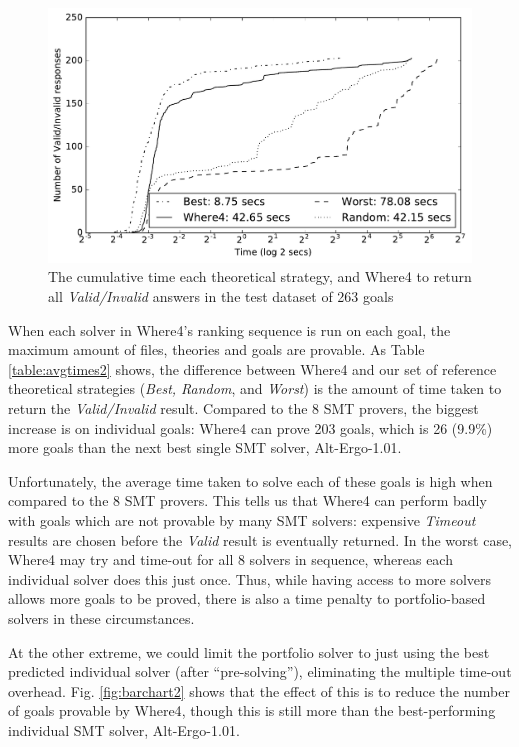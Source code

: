 \documentclass[submission,copyright,creativecommons]{eptcs}
\begin{document}
\begin{figure}
	\centering
	\includegraphics[width=0.8\linewidth]{line-graph-eval-provers}
	\caption{The cumulative time each theoretical strategy, and \textsf{Where4} to return all \textit{Valid/Invalid} answers in the test dataset of 263 goals}
	\label{fig:line-graph-eval-provers}
\end{figure}

When each solver in \textsf{Where4}'s ranking sequence is run on each goal, the maximum amount of files, theories and goals are provable. As Table \ref{table:avgtimes2} shows, the difference between \textsf{Where4} and our set of reference theoretical strategies (\textit{Best, Random}, and \textit{Worst}) is the amount of time taken to return the \textit{Valid/Invalid} result. Compared to the 8 SMT provers, the biggest increase is on individual goals: \textsf{Where4} can prove 203 goals, which is 26 (9.9\%) more goals than the next best single SMT solver, Alt-Ergo-1.01.

Unfortunately, the average time taken to solve each of these goals is high when compared to the 8 SMT provers. This tells us that \textsf{Where4} can perform badly with goals which are not provable by many SMT solvers: expensive \textit{Timeout} results are chosen before the \textit{Valid} result is eventually returned.   In the worst case, \textsf{Where4} may try and time-out for all 8 solvers in sequence, whereas each individual solver does this just once.   Thus, while having access to more solvers allows more goals to be proved, there is also a time penalty to portfolio-based solvers in these circumstances.

At the other extreme, we could limit the portfolio solver to just using the best predicted individual solver (after ``pre-solving''), eliminating the multiple time-out overhead.
Fig. \ref{fig:barchart2} shows that the effect of this is to reduce the number of goals provable by \textsf{Where4}, though this is still more than the best-performing individual SMT solver, Alt-Ergo-1.01.
\end{document}
